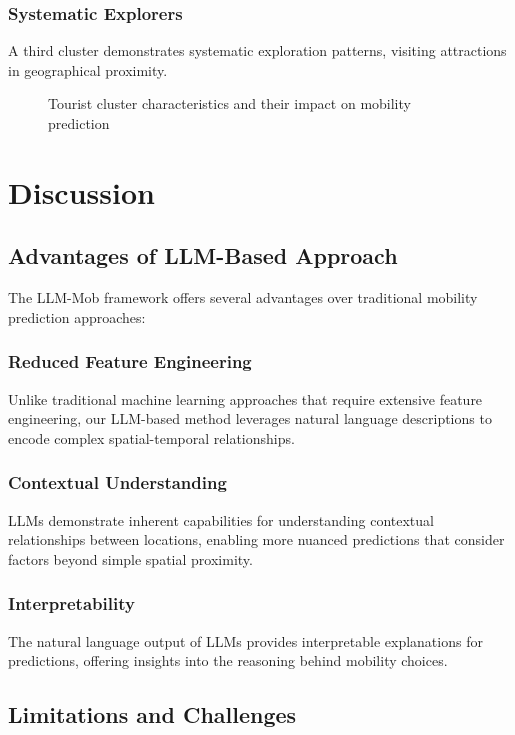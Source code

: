 \documentclass[12pt,a4paper]{article}
\begin{document}
\subsubsection{Systematic Explorers}
A third cluster demonstrates systematic exploration patterns, visiting attractions in geographical proximity.

\begin{figure}[H]
\centering
\caption{Tourist cluster characteristics and their impact on mobility prediction}
\label{fig:cluster_analysis}
\end{figure}

\section{Discussion}

\subsection{Advantages of LLM-Based Approach}

The LLM-Mob framework offers several advantages over traditional mobility prediction approaches:

\subsubsection{Reduced Feature Engineering}
Unlike traditional machine learning approaches that require extensive feature engineering, our LLM-based method leverages natural language descriptions to encode complex spatial-temporal relationships.

\subsubsection{Contextual Understanding}
LLMs demonstrate inherent capabilities for understanding contextual relationships between locations, enabling more nuanced predictions that consider factors beyond simple spatial proximity.

\subsubsection{Interpretability}
The natural language output of LLMs provides interpretable explanations for predictions, offering insights into the reasoning behind mobility choices.

\subsection{Limitations and Challenges}
\end{document}

